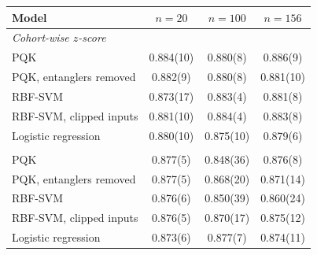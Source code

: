 \begin{tabular}{lccc}
\toprule
Model & $n=20$ & $n=100$ & $n=156$ \\
\midrule
\multicolumn{4}{l}{\textit{Cohort-wise $z$-score}} \\
PQK & 0.884(10) & 0.880(8) & 0.886(9) \\
PQK, entanglers removed & 0.882(9) & 0.880(8) & 0.881(10) \\
RBF-SVM & 0.873(17) & 0.883(4) & 0.881(8) \\
RBF-SVM, clipped inputs & 0.881(10) & 0.884(4) & 0.883(8) \\
Logistic regression & 0.880(10) & 0.875(10) & 0.879(6) \\
\addlinespace
\multicolumn{4}{l}{\textit{Per-sample rank}} \\
PQK & 0.877(5) & 0.848(36) & 0.876(8) \\
PQK, entanglers removed & 0.877(5) & 0.868(20) & 0.871(14) \\
RBF-SVM & 0.876(6) & 0.850(39) & 0.860(24) \\
RBF-SVM, clipped inputs & 0.876(5) & 0.870(17) & 0.875(12) \\
Logistic regression & 0.873(6) & 0.877(7) & 0.874(11) \\
\bottomrule
\end{tabular}
